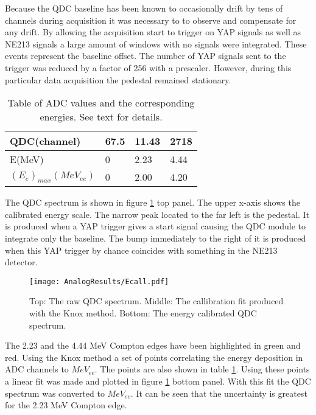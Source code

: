 \documentclass[main.tex]{subfiles}
\begin{document}
Because the QDC baseline has been known to occasionally drift by tens of channels during acquisition it was necessary to to observe and compensate for any drift. By allowing the acquisition start to trigger on YAP signals as well as NE213 signals a large amount of windows with no signals were integrated. These events represent the baseline offset. The number of YAP signals sent to the trigger was reduced by a factor of 256 with a prescaler. However, during this particular data acquisition the pedestal remained stationary.

\begin{table}[hb]
	\center
	\begin{tabular}{|l|l|l|l|}
	\hline
	QDC(channel)             & 67.5 & 11.43 & 2718 \\
	\hline
	E(MeV)          & 0    & 2.23  & 4.44 \\
	\hline
	$(E_{e})_{max}(MeV_{ee})$ & 0    & 2.00  & 4.20 \\
	\hline
	\end{tabular}
   	\captionsetup{width=0.435\linewidth}
	\caption{Table of ADC values and the corresponding energies. See text for details.}
	\label{tab:knox}
\end{table}

The QDC spectrum is shown in figure \ref{fig:qdc_a} top panel. The upper x-axis shows the calibrated energy scale. The narrow peak located to the far left is the pedestal. It is produced when a YAP trigger gives a start signal causing the QDC module to integrate only the baseline. The bump immediately to the right of it is produced when this YAP trigger by chance coincides with something in the NE213 detector.
\begin{figure}[ht!]
    \centering
        \texttt{[image: AnalogResults/Ecall.pdf]}
        \caption{Top: The raw QDC spectrum. Middle: The callibration fit produced with the Knox method. Bottom: The energy calibrated QDC spectrum.}
    \label{fig:qdc_a}
\end{figure}

The 2.23 and the 4.44 MeV Compton edges have been highlighted in green and red. Using the Knox method a set of points correlating the energy deposition in ADC channels to $MeV_{ee}$. The points are also shown in table \ref{tab:knox}. Using these points a linear fit was made and plotted in figure \ref{fig:qdc_a} bottom panel. With this fit the QDC spectrum was converted to $MeV_{ee}$. It can be seen that the uncertainty is greatest for the 2.23 MeV Compton edge.
\end{document}
